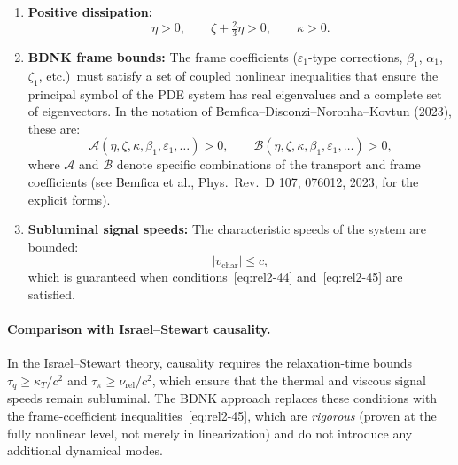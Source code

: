 \begin{enumerate}
\item \textbf{Positive dissipation:}
\begin{equation}
\label{eq:rel2-44}
  \eta > 0, \qquad \zeta + \tfrac{2}{3}\eta > 0, \qquad \kappa > 0.
\end{equation}

\item \textbf{BDNK frame bounds:}
The frame coefficients ($\varepsilon_1$-type corrections, $\beta_1$,
$\alpha_1$, $\zeta_1$, etc.)\ must satisfy a set of coupled nonlinear
inequalities that ensure the principal symbol of the PDE system has real
eigenvalues and a complete set of eigenvectors.  In the notation of
Bemfica--Disconzi--Noronha--Kovtun (2023), these are:
\begin{equation}
\label{eq:rel2-45}
  \mathcal{A}(\eta, \zeta, \kappa, \beta_1, \varepsilon_1, \ldots) > 0,
  \qquad
  \mathcal{B}(\eta, \zeta, \kappa, \beta_1, \varepsilon_1, \ldots) > 0,
\end{equation}
where $\mathcal{A}$ and $\mathcal{B}$ denote specific combinations of the
transport and frame coefficients (see Bemfica et al., Phys.\ Rev.\ D 107,
076012, 2023, for the explicit forms).

\item \textbf{Subluminal signal speeds:} The characteristic speeds of
the system are bounded:
\begin{equation}
\label{eq:rel2-46}
  |v_{\mathrm{char}}| \le c,
\end{equation}
which is guaranteed when conditions~\eqref{eq:rel2-44}
and~\eqref{eq:rel2-45} are satisfied.
\end{enumerate}

\paragraph{Comparison with Israel--Stewart causality.}
In the Israel--Stewart theory, causality requires the relaxation-time bounds
$\tau_q \ge \kappa_T/c^2$ and $\tau_\pi \ge \nu_{\mathrm{rel}}/c^2$,
which ensure that the thermal and viscous signal speeds remain subluminal.
The BDNK approach replaces these conditions with the frame-coefficient
inequalities~\eqref{eq:rel2-45}, which are \emph{rigorous} (proven at
the fully nonlinear level, not merely in linearization) and do not
introduce any additional dynamical modes.

